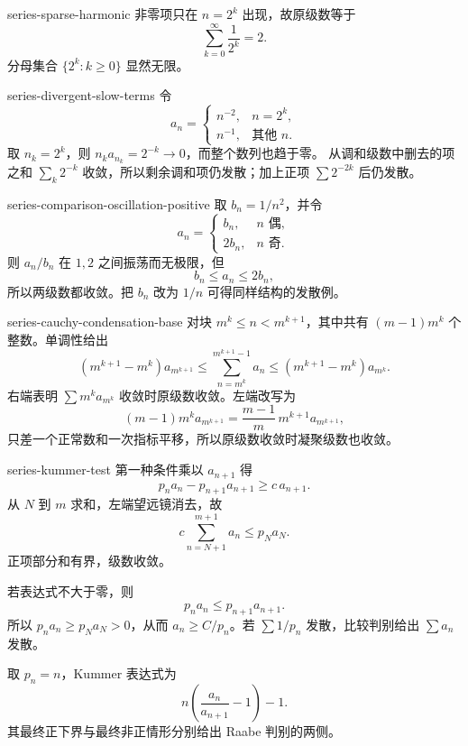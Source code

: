 \begin{solution}{series-sparse-harmonic}
非零项只在 \(n=2^k\) 出现，故原级数等于
\[
 \sum_{k=0}^\infty\frac1{2^k}=2.
\]
分母集合 \(\{2^k:k\ge0\}\) 显然无限。
\end{solution}

\begin{solution}{series-divergent-slow-terms}
令
\[
 a_n=\begin{cases}
 n^{-2},&n=2^k,\\
 n^{-1},&\text{其他 }n.
 \end{cases}
\]
取 \(n_k=2^k\)，则 \(n_ka_{n_k}=2^{-k}\to0\)，而整个数列也趋于零。
从调和级数中删去的项之和
\(\sum_k2^{-k}\) 收敛，所以剩余调和项仍发散；加上正项
\(\sum 2^{-2k}\) 后仍发散。
\end{solution}

\begin{solution}{series-comparison-oscillation-positive}
取 \(b_n=1/n^2\)，并令
\[
 a_n=\begin{cases}
 b_n,&n\text{ 偶},\\
 2b_n,&n\text{ 奇}.
 \end{cases}
\]
则 \(a_n/b_n\) 在 \(1,2\) 之间振荡而无极限，但
\[
 b_n\le a_n\le2b_n,
\]
所以两级数都收敛。把 \(b_n\) 改为 \(1/n\) 可得同样结构的发散例。
\end{solution}

\begin{solution}{series-cauchy-condensation-base}
对块 \(m^k\le n<m^{k+1}\)，其中共有
\((m-1)m^k\) 个整数。单调性给出
\[
 (m^{k+1}-m^k)a_{m^{k+1}}
 \le\sum_{n=m^k}^{m^{k+1}-1}a_n
 \le(m^{k+1}-m^k)a_{m^k}.
\]
右端表明 \(\sum m^ka_{m^k}\) 收敛时原级数收敛。左端改写为
\[
 (m-1)m^k a_{m^{k+1}}
 =\frac{m-1}{m}\,m^{k+1}a_{m^{k+1}},
\]
只差一个正常数和一次指标平移，所以原级数收敛时凝聚级数也收敛。
\end{solution}

\begin{solution}{series-kummer-test}
第一种条件乘以 \(a_{n+1}\) 得
\[
 p_na_n-p_{n+1}a_{n+1}\ge c\,a_{n+1}.
\]
从 \(N\) 到 \(m\) 求和，左端望远镜消去，故
\[
 c\sum_{n=N+1}^{m+1}a_n\le p_Na_N.
\]
正项部分和有界，级数收敛。

若表达式不大于零，则
\[
 p_na_n\le p_{n+1}a_{n+1}.
\]
所以 \(p_na_n\ge p_Na_N>0\)，从而
\(a_n\ge C/p_n\)。若 \(\sum1/p_n\) 发散，比较判别给出
\(\sum a_n\) 发散。

取 \(p_n=n\)，Kummer 表达式为
\[
 n\left(\frac{a_n}{a_{n+1}}-1\right)-1.
\]
其最终正下界与最终非正情形分别给出 Raabe 判别的两侧。
\end{solution}
